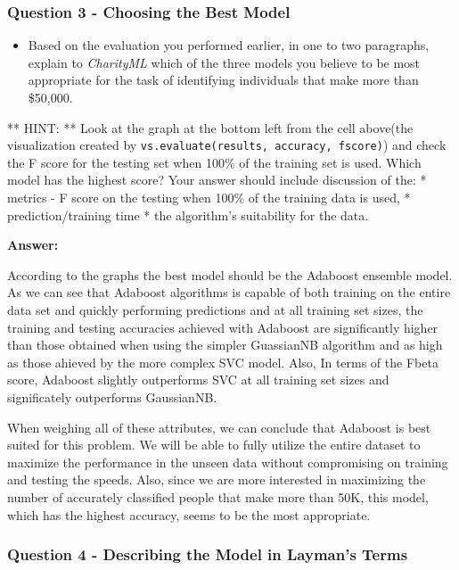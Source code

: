 \documentclass[11pt]{article}
\providecommand{\tightlist}{%
      \setlength{\itemsep}{0pt}\setlength{\parskip}{0pt}}
\begin{document}
    \subsubsection{Question 3 - Choosing the Best
Model}\label{question-3---choosing-the-best-model}

\begin{itemize}
\tightlist
\item
  Based on the evaluation you performed earlier, in one to two
  paragraphs, explain to \emph{CharityML} which of the three models you
  believe to be most appropriate for the task of identifying individuals
  that make more than \$50,000.
\end{itemize}

** HINT: ** Look at the graph at the bottom left from the cell above(the
visualization created by
\texttt{vs.evaluate(results,\ accuracy,\ fscore)}) and check the F score
for the testing set when 100\% of the training set is used. Which model
has the highest score? Your answer should include discussion of the: *
metrics - F score on the testing when 100\% of the training data is
used, * prediction/training time * the algorithm's suitability for the
data.

    \textbf{Answer: }

According to the graphs the best model should be the Adaboost ensemble
model. As we can see that Adaboost algorithms is capable of both
training on the entire data set and quickly performing predictions and
at all training set sizes, the training and testing accuracies achieved
with Adaboost are significantly higher than those obtained when using
the simpler GuassianNB algorithm and as high as those ahieved by the
more complex SVC model. Also, In terms of the Fbeta score, Adaboost
slightly outperforms SVC at all training set sizes and significately
outperforms GaussianNB.

When weighing all of these attributes, we can conclude that Adaboost is
best suited for this problem. We will be able to fully utilize the
entire dataset to maximize the performance in the unseen data without
compromising on training and testing the speeds. Also, since we are more
interested in maximizing the number of accurately classified people that
make more than 50K, this model, which has the highest accuracy, seems to
be the most appropriate.

    \subsubsection{Question 4 - Describing the Model in Layman's
Terms}\label{question-4---describing-the-model-in-laymans-terms}
\end{document}
